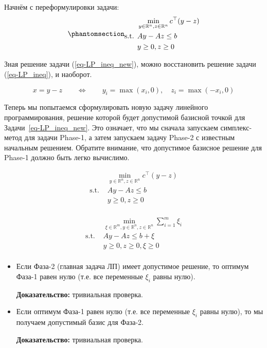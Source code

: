 \documentclass[
  russian,
  letterpaper,
  DIV=11,
  numbers=noendperiod]{scrartcl}
\begin{document}
Начнём с переформулировки задачи:
\begin{equation}\phantomsection\label{eq-LP_ineq_new}{
\begin{split}
&\min_{y \in \mathbb{R}^n, z \in \mathbb{R}^n} c^{\top}(y-z) \\
\text{s.t. } & Ay - Az \leq b \\ 
& y \geq 0, z \geq 0 \\ 
\end{split}
}\end{equation}

Зная решение задачи (\ref{eq-LP_ineq_new}), можно восстановить решение
задачи (\ref{eq-LP_ineq}), и наоборот.

\[
x = y-z \qquad \Leftrightarrow \qquad y_i = \max(x_i, 0), \quad z_i = \max(-x_i, 0)
\]

Теперь мы попытаемся сформулировать новую задачу линейного
программирования, решение которой будет допустимой базисной точкой для
Задачи~\ref{eq-LP_ineq_new}. Это означает, что мы сначала запускаем
симплекс-метод для задачи Phase-1, а затем запускаем задачу Phase-2 с
известным начальным решением. Обратите внимание, что допустимое базисное
решение для Phase-1 должно быть легко вычислимо.

\[
\tag{Фаза-2 (главная задача ЛП)}
\begin{split}
&\min_{y \in \mathbb{R}^n, z \in \mathbb{R}^n} c^{\top}(y-z) \\
\text{s.t. } & Ay - Az \leq b \\ 
& y \geq 0, z \geq 0 \\ 
\end{split}
\]

\[
\tag{Фаза-1}
\begin{split}
&\min_{\xi \in \mathbb{R}^m, y \in \mathbb{R}^n, z \in \mathbb{R}^n} \sum\limits_{i=1}^m \xi_i \\
\text{s.t. } & Ay - Az \leq b + \xi \\ 
& y \geq 0, z \geq 0, \xi \geq 0 \\ 
\end{split}
\]

\begin{itemize}
\item
  Если Фаза-2 (главная задача ЛП) имеет допустимое решение, то оптимум
  Фаза-1 равен нулю (т.е. все переменные \(\xi_i\) равны нулю).

  \textbf{Доказательство:} тривиальная проверка.
\item
  Если оптимум Фаза-1 равен нулю (т.е. все переменные \(\xi_i\) равны
  нулю), то мы получаем допустимый базис для Фаза-2.

  \textbf{Доказательство:} тривиальная проверка.
\end{itemize}
\end{document}
